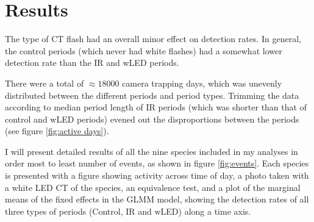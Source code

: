 \chapter{Results}


The type of CT flash had an overall minor effect on detection rates.
In general, the control periods (which never had white flashes) had a somewhat lower detection rate than the IR and wLED periods.

There were a total of $\approx 18 000$ camera trapping days, which was unevenly distributed between the different periods and period types. Trimming the data according to median period length of IR periods (which was shorter than that of control and wLED periods) evened out the disproportions between the periods (see figure \ref{fig:active days}).



I will present detailed results of all the nine species included in my analyses in order most to least number of events, as shown in figure \ref{fig:events}.
Each species is presented with a figure showing activity across time of day, a photo taken with a white LED CT of the species, %
an equivalence test, and a plot of the marginal means of the fixed effects in the GLMM model, showing the detection rates of all three types of periods (Control, IR and wLED) along a time axis.

